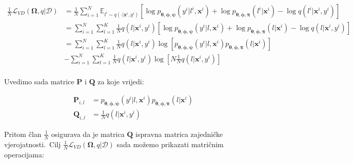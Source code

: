 \documentclass[diplomskirad]{fer}
\begin{document}
\begin{equation}
  \begin{aligned}
    \frac{1}{N} \mathcal{L}_{VD}(\bm{\Omega}, q | \mathcal{D}) &= \frac{1}{N} \sum_{i=1}^{N} \mathbb{E}_{l^i \sim q(\cdot | \bm{x}^i, y^i)} \left[\log p_{\bm{\theta}, \bm{\phi}, \bm{\psi}}(y^i | l^i, \bm{x}^i) + \log p_{\bm{\theta}, \bm{\phi}, \bm{\pi}}(l^i | \bm{x}^i) - \log q(l^i | \bm{x}^i, y^i) \right] \\
                                                               &= \sum_{i=1}^{N} \sum_{l=1}^{K} \frac{1}{N} q(l | \bm{x}^i, y^i) \left[\log p_{\bm{\theta}, \bm{\phi}, \bm{\psi}}(y^i | l, \bm{x}^i) + \log p_{\bm{\theta}, \bm{\phi}, \bm{\pi}}(l | \bm{x}^i) - \log q(l | \bm{x}^i, y^i) \right] \\ 
                                                               &= \sum_{i=1}^{N} \sum_{l=1}^{K} \frac{1}{N} q(l | \bm{x}^i, y^i) \log \left[p_{\bm{\theta}, \bm{\phi}, \bm{\psi}}(y^i | l, \bm{x}^i) p_{\bm{\theta}, \bm{\phi}, \bm{\pi}}(l | \bm{x}^i) \right] \\ 
                                                               &- \sum_{i=1}^{N} \sum_{l=1}^{K} \frac{1}{N} q(l | \bm{x}^i, y^i) \log \left[N \frac{1}{N} q(l | \bm{x}^i, y^i) \right] \\ 
  \end{aligned}
  \label{eq:vibe_e_step_init}
\end{equation}

Uvedimo sada matrice $\bm{P}$ i $\bm{Q}$ za koje vrijedi:

\begin{equation}
  \begin{aligned}
    \bm{P}_{i, l} &= p_{\bm{\theta}, \bm{\phi}, \bm{\psi}}(y^i | l, \bm{x}^i) p_{\bm{\theta}, \bm{\phi}, \bm{\pi}}(l | \bm{x}^i) \\
    \bm{Q}_{i, l} &= \frac{1}{N} q(l | \bm{x}^i, y^i)
  \end{aligned}
  \label{eq:vibe_matrices_p_q}
\end{equation}

Pritom član $\frac{1}{N}$ osigurava da je matrica $\bm{Q}$ ispravna matrica zajedničke vjerojatnosti.\ Cilj $\frac{1}{N} \mathcal{L}_{VD}(\bm{\Omega}, q | \mathcal{D})$ sada možemo prikazati matričnim operacijama:
\end{document}

